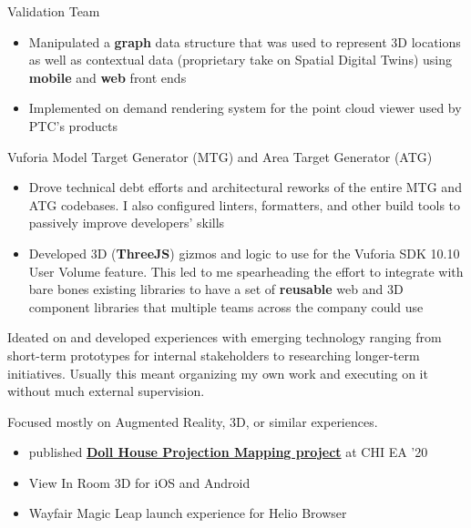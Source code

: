 \documentclass[]{plushcv}
\begin{document}
\begin{minipage}[t]{0.70\textwidth}
    \begin{tightemize}
        \sectionsep
        \item Validation Team
        \begin{itemize}
            \item Manipulated a \textbf{graph} data structure that was used to
                  represent 3D locations as well as contextual data
                  (proprietary take on Spatial Digital Twins)
                  using \textbf{mobile} and \textbf{web} front ends
            \item Implemented on demand rendering system for the point cloud viewer used by PTC's products
        \end{itemize}
        \item Vuforia Model Target Generator (MTG) and Area Target Generator (ATG)
        \begin{itemize}
            \item Drove technical debt efforts and architectural reworks of the entire MTG and ATG codebases.
                  I also configured linters, formatters, and other build tools to
                  passively improve developers' skills
            \item Developed 3D (\textbf{ThreeJS}) gizmos and logic to use for the
                  Vuforia SDK 10.10 User Volume feature.
                  This led to me spearheading the effort to integrate with bare bones
                  existing libraries to have a set of
                  \textbf{reusable} web and 3D component libraries
                  that multiple teams across the company could use
        \end{itemize}
    \end{tightemize}
    \sectionsep

    \begin{tightemize}
        \sectionsep
        \item Ideated on and developed experiences with emerging technology ranging from short-term prototypes for internal stakeholders to
        researching longer-term initiatives. Usually this meant organizing my own work and executing on it without much external supervision.
        \item Focused mostly on Augmented Reality, 3D, or similar experiences.
        \begin{itemize}
            \item published \textbf{\href{https://dl.acm.org/doi/10.1145/3334480.3383180}{Doll House Projection Mapping project}} at CHI EA ’20
            \item View In Room 3D for iOS and Android
            \item Wayfair Magic Leap launch experience for Helio Browser
        \end{itemize}
    \end{tightemize}
    \sectionsep


\end{minipage}
\end{document}
